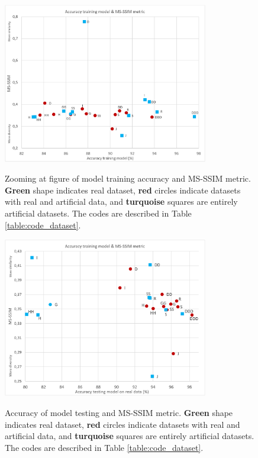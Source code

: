 \documentclass[journal]{IEEEtran}
\begin{document}
\begin{figure}
\centering
{\includegraphics[width=0.8\textwidth,keepaspectratio]{img/entrenamiento_msssim_zoom.png}}
\caption{Zooming at figure of model training accuracy and MS-SSIM metric. \textcolor{dotgreen}{\textbf{Green}} shape indicates real dataset, \textcolor{dotred}{\textbf{red}} circles indicate datasets with real and artificial data, and \textcolor{dotsky}{\textbf{turquoise}} squares are entirely artificial datasets. The codes are described in Table \ref{table:code_dataset}.}
\label{fig:da_training_msssim_zoom}
\end{figure}

\begin{figure}
\centering
{\includegraphics[width=0.8\textwidth,keepaspectratio]{img/prueba_msssim.png}}
\caption{Accuracy of model testing and MS-SSIM metric. \textcolor{dotgreen}{\textbf{Green}} shape indicates real dataset, \textcolor{dotred}{\textbf{red}} circles indicate datasets with real and artificial data, and \textcolor{dotsky}{\textbf{turquoise}} squares are entirely artificial datasets. The codes are described in Table \ref{table:code_dataset}.}
\label{fig:da_test_msssim}
\end{figure}
\end{document}
